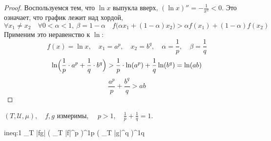 \begin{proof}
	Воспользуемся тем, что $ \ln x $ выпукла вверх, \ie $ (\ln x)'' = -\frac1{x^2} < 0 $.
	Это означает, что график лежит над хордой, \ie
	$$ \forall x_1 \ne x_2 \quad \forall 0 < \alpha < 1, ~
	\beta = 1 - \alpha \quad f\bigl(\alpha x_1 + (1 - \alpha)x_2 \bigr) > \alpha f(x_1) + (1 - \alpha)f(x_2) $$
	Применим это неравенство к $ \ln $:
	$$ f(x) = \ln x, \quad x_1 = a^p, \quad x_2 = b^q, \quad \alpha = \frac1p, \quad \beta = \frac1q $$
	$$ \ln\Bigl(\frac1p \cdot a^p + \frac1q \cdot b^q\Bigr) > \frac1p \cdot \ln(a^p) + \frac1q \ln(b^q) = \ln(ab) $$
	$$ \frac{a^p}p + \frac{b^q}q > ab $$
\end{proof}

\begin{statement}
	$ (T, \mathscr U, \mu), \quad f, g $ измеримы, $ \quad p > 1, \quad \frac1p + \frac1q = 1 $.

	\begin{equ}{ineq:1}
		\int\limits_T |fg| \di \mu \le \Bigl( \int\limits_T |f|^p \di \mu \Bigr)^{\frac1p} \cdot
		\Bigl( \int\limits_T |g|^q \di \mu \Bigr)^{\frac1q}
	\end{equ}
\end{statement}

